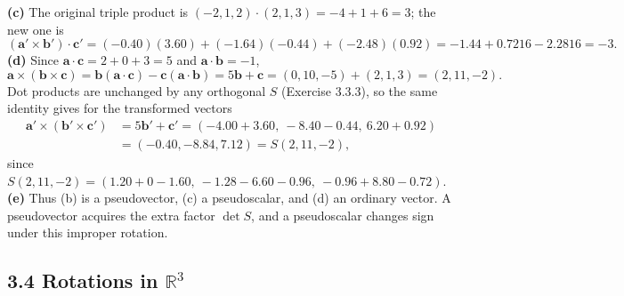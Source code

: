 \textbf{(c)} The original triple product is
$(-2,1,2)\cdot(2,1,3)=-4+1+6=3$; the new one is
\[
(\mathbf a'\times\mathbf b')\cdot\mathbf c'
=(-0.40)(3.60)+(-1.64)(-0.44)+(-2.48)(0.92)
=-1.44+0.7216-2.2816=-3.
\]
\textbf{(d)} Since $\mathbf a\cdot\mathbf c=2+0+3=5$ and
$\mathbf a\cdot\mathbf b=-1$,
\[
\mathbf a\times(\mathbf b\times\mathbf c)
=\mathbf b(\mathbf a\cdot\mathbf c)-\mathbf c(\mathbf a\cdot\mathbf b)
=5\mathbf b+\mathbf c=(0,10,-5)+(2,1,3)=(2,11,-2).
\]
Dot products are unchanged by any orthogonal $S$ (Exercise 3.3.3), so
the same identity gives for the transformed vectors
\[
\begin{aligned}
\mathbf a'\times(\mathbf b'\times\mathbf c')
&=5\mathbf b'+\mathbf c'
=(-4.00+3.60,\ -8.40-0.44,\ 6.20+0.92)\\
&=(-0.40,-8.84,7.12)=S(2,11,-2),
\end{aligned}
\]
since $S(2,11,-2)=(1.20+0-1.60,\ -1.28-6.60-0.96,\ -0.96+8.80-0.72)$.
\textbf{(e)} Thus (b) is a pseudovector, (c) a pseudoscalar, and
(d) an ordinary vector. A pseudovector acquires the extra factor
$\det S$, and a pseudoscalar changes sign under this improper rotation.


\subsection*{3.4 Rotations in \texorpdfstring{$\mathbb{R}^{3}$}{R3}}

